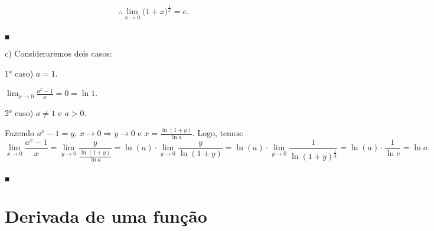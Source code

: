 \documentclass{article}
\begin{document}
{\begin{newpage}
\par
\vspace{0.3cm}
$$\therefore \displaystyle{\lim_{x\to 0}} \Big(1 + x\Big)^{\frac{1}{x}} = e.$$ \begin{flushright} $_{\blacksquare }$ \end{flushright}
\par
\vspace{0.3cm}
c) Consideraremos dois casos:
\par
1° caso) $a=1$.
\begin{center} $\displaystyle{\lim_{x\to 0}} \frac{a^x - 1}{x} = 0 = \ln{1}.$\end{center}
\par
\vspace{0.3cm}
2° caso) $a\neq 1$ e $a>0$.
\par Fazendo $a^x - 1=y$, $x\rightarrow 0\Rightarrow y\rightarrow 0$ e $x=\displaystyle{\frac{\ln{(1+y)}}{\ln{a}}}$. Logo, temos:
\begin{equation*} \displaystyle{\lim_{x\to 0}} \frac{a^x - 1}{x} = \displaystyle{\lim_{y\to 0}} \displaystyle{\frac{y}{\displaystyle{\frac{\ln{(1+y)}}{\ln{a}}}}} = \ln{(a)}\cdot\displaystyle{\lim_{y\to 0}} \displaystyle{\frac{y}{\ln{(1+y)}}} = \ln{(a)}\cdot \displaystyle{\lim_{y\to 0}} \displaystyle{\frac{1}{\ln{(1+y)^{\frac{1}{y}}}}} = \ln{(a)}\cdot\frac{1}{\ln{e}} = \ln{a}. \end{equation*} \begin{flushright} $_{\blacksquare }$ \end{flushright}
\par
\vspace{0.3cm}
\section{Derivada de uma função}

\end{newpage}}
\end{document}
